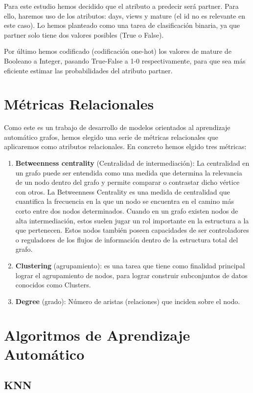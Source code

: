 \documentclass[12pt]{article}
\begin{document}
Para este estudio hemos decidido que el atributo a predecir será partner. Para ello, haremos uso de los atributos: days, views y mature (el id no es relevante en este caso). Lo hemos planteado como una tarea de clasificación binaria, ya que partner solo tiene dos valores posibles (True o False).

 Por último hemos codificado (codificación one-hot) los valores de mature de Booleano a Integer, pasando True-False a 1-0 respectivamente, para que sea más eficiente estimar las probabilidades del atributo partner.




\section{Métricas Relacionales}
Como este es un trabajo de desarrollo de modelos orientados al aprendizaje automático grafos, hemos elegido una serie de métricas relacionales que aplicaremos como atributos relacionales. En concreto hemos elgido tres métricas:

\begin{enumerate}
\item\textbf{Betweenness centrality}  (Centralidad de intermediación): La centralidad en un grafo puede ser entendida como una medida que determina la relevancia de un nodo dentro del grafo y permite comparar o contrastar dicho vértice con otros. La Betweenness Centrality es una medida de centralidad que cuantifica la frecuencia en la que un nodo se encuentra en el camino más corto entre dos nodos determinados. Cuando en un grafo existen nodos de alta intermediación, estos suelen jugar un rol importante en la estructura a la que pertenecen. Estos nodos también poseen capacidades de ser controladores o reguladores de los flujos de información dentro de la estructura total del grafo. 
\item\textbf{Clustering} (agrupamiento): es una tarea que tiene como finalidad principal lograr el agrupamiento de nodos, para lograr construir subconjuntos de datos conocidos como Clusters.
\item\textbf{Degree} (grado): Número de aristas (relaciones) que inciden sobre el nodo.
\end{enumerate}
 
\section{Algoritmos de Aprendizaje Automático}

\subsection{KNN}
\end{document}
